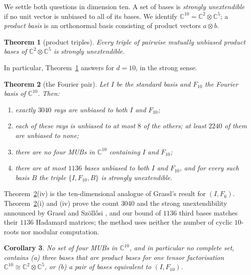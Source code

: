 \documentclass[11pt]{article}
\newtheorem{theorem}{Theorem}
\newtheorem{corollary}[theorem]{Corollary}
\theoremstyle{definition}
\theoremstyle{remark}
\newcommand{\C}{\mathbb{C}}
\begin{document}
We settle both questions in dimension ten.
A set of bases is \emph{strongly unextendible} if no unit vector is unbiased
to all of its bases. We identify $\C^{10}=\C^2\otimes\C^5$; a \emph{product basis} is an orthonormal basis consisting
of product vectors $a\otimes b$.

\begin{theorem}[product triples]\label{thm:A}
Every triple of pairwise mutually unbiased product bases of $\C^2\otimes\C^5$ is strongly unextendible.
\end{theorem}

In particular, Theorem~\ref{thm:A} answers \cite[Problem~10.8]{MW2026} for $d=10$, in the strong sense.

\begin{theorem}[the Fourier pair]\label{thm:B}
Let $I$ be the standard basis and $F_{10}$ the Fourier basis of $\C^{10}$. Then:
\begin{enumerate}[label=(\roman*)]
\item exactly $3040$ rays are unbiased to both $I$ and $F_{10}$;
\item each of these rays is unbiased to at most $8$ of the others; at least $2240$ of them are unbiased to none;
\item there are no four MUBs in $\C^{10}$ containing $I$ and $F_{10}$;
\item there are at most $1136$ bases unbiased to both $I$ and $F_{10}$, and for every such basis $B$ the triple
  $\{I,F_{10},B\}$ is strongly unextendible.
\end{enumerate}
\end{theorem}

Theorem~\ref{thm:B}(iv) is the ten-dimensional analogue of Grassl's result for $(I,F_6)$. Theorem~\ref{thm:B}(i)
and (iv) prove the count $3040$ and the strong unextendibility announced by Grassl and Sz\"oll\H{o}si
\cite{GrasslSzollosi2022}, and our bound of $1136$ third bases matches their $1136$ Hadamard matrices; the method uses
neither the number of cyclic $10$-roots nor modular computation.

\begin{corollary}\label{cor:C}
No set of four MUBs in $\C^{10}$, and in particular no complete set, contains
(a) three bases that are product bases for one tensor factorisation $\C^{10}\cong\C^2\otimes\C^5$, or
(b) a pair of bases equivalent to $(I,F_{10})$.
\end{corollary}
\end{document}
